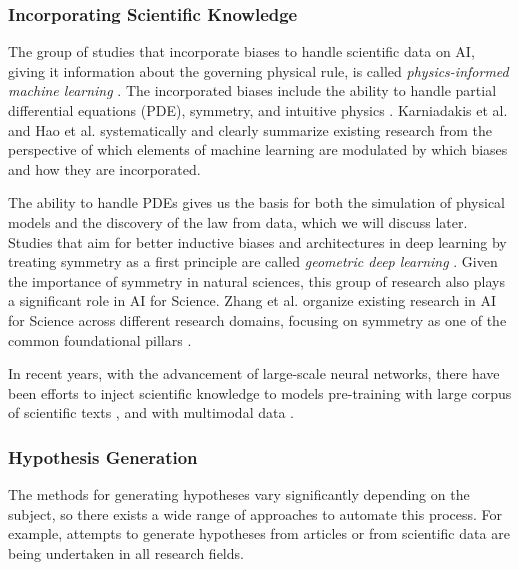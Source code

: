 \subsubsection{Incorporating Scientific Knowledge}

The group of studies that incorporate biases to handle scientific data on AI, giving it information about the governing physical rule, is called \textit{physics-informed machine learning} \cite{karniadakis2021physics}. The incorporated biases include the ability to handle partial differential equations (PDE), symmetry, and intuitive physics \cite{hao2022physics}. Karniadakis et al. \cite{karniadakis2021physics} and Hao et al. \cite{hao2022physics} systematically and clearly summarize existing research from the perspective of which elements of machine learning are modulated by which biases and how they are incorporated. %

The ability to handle PDEs gives us the basis for both the simulation of physical models and the discovery of the law from data, which we will discuss later. Studies that aim for better inductive biases and architectures in deep learning by treating symmetry as a first principle are called \textit{geometric deep learning} \cite{bronstein2021geometric}. Given the importance of symmetry in natural sciences, this group of research also plays a significant role in AI for Science. Zhang et al.  organize existing research in AI for Science across different research domains, focusing on symmetry as one of the common foundational pillars \cite{zhang2023artificial}.

In recent years, with the advancement of large-scale neural networks, there have been efforts to inject scientific knowledge to models pre-training with large corpus of scientific texts \cite{taylor2022galactica,beltagy2019scibert}, and with multimodal data \cite{singhal2023towards}.

\subsubsection{Hypothesis Generation}

The methods for generating hypotheses vary significantly depending on the subject, so there exists a wide range of approaches to automate this process. For example, attempts to generate hypotheses from articles or from scientific data are being undertaken in all research fields. 

